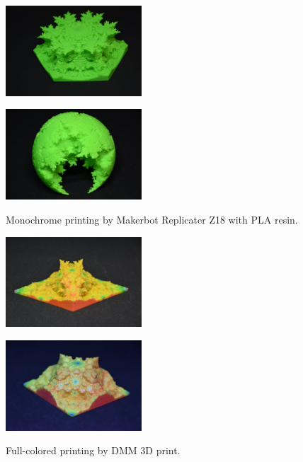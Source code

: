 \begin{figure}[h!tbp]
  \begin{minipage}[t]{0.5\textwidth}
   \centering
   \includegraphics[width=2in, keepaspectratio]{./img/application/sphairahedron/3dprint/mono1.jpg}
   \subcaption{}
   \label{fig:}
  \end{minipage}
 \hspace*{\fill}
  \begin{minipage}[t]{0.5\textwidth}
   \centering
   \includegraphics[width=2in, keepaspectratio]{./img/application/sphairahedron/3dprint/mono2.jpg}
   \subcaption{}
   \label{fig:}
  \end{minipage}
  \hspace*{\fill}
  \caption{Monochrome printing by Makerbot Replicater Z18 with PLA resin.}
  \label{fig:3dmono}
  \begin{minipage}[t]{0.5\textwidth}
   \centering
   \includegraphics[width=2in, keepaspectratio]{./img/application/sphairahedron/3dprint/col1.jpg}
   \label{fig:3dcolPlaster}
  \end{minipage}
  \hspace*{\fill}
  \begin{minipage}[t]{0.5\textwidth}
   \centering
   \includegraphics[width=2in, keepaspectratio]{./img/application/sphairahedron/3dprint/col2.jpg}
   \label{fig:3dcolPlastic}
  \end{minipage}
  \hspace*{\fill}
  \caption{Full-colored printing by DMM 3D print.}
  \label{fig:}
\end{figure}

